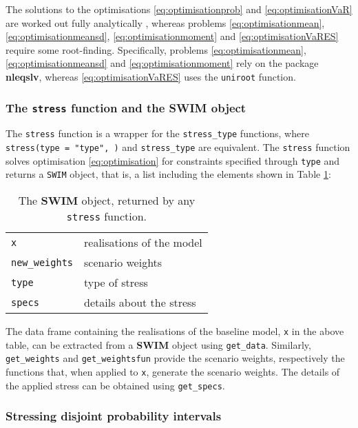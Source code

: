 \documentclass[
]{article}
\begin{document}
The solutions to the optimisations \eqref{eq:optimisationprob} and \eqref{eq:optimisationVaR} are worked out fully analytically \citep{Pesenti2019}, whereas problems \eqref{eq:optimisationmean}, \eqref{eq:optimisationmeansd}, \eqref{eq:optimisationmoment} and \eqref{eq:optimisationVaRES} require some root-finding. Specifically, problems \eqref{eq:optimisationmean}, \eqref{eq:optimisationmeansd} and \eqref{eq:optimisationmoment} rely on the package \textbf{nleqslv}, whereas \eqref{eq:optimisationVaRES} uses the \texttt{uniroot} function.

\hypertarget{Rstress}{%
\subsubsection{\texorpdfstring{The \texttt{stress} function and the \textbf{SWIM} object}{The stress function and the SWIM object}}\label{Rstress}}

The \texttt{stress} function is a wrapper for the \texttt{stress\_type} functions, where \texttt{stress(type\ =\ "type",\ )} and \texttt{stress\_type} are equivalent. The \texttt{stress} function solves optimisation \eqref{eq:optimisation} for constraints specified through \texttt{type} and returns a \texttt{SWIM} object, that is, a list including the elements shown in Table \ref{tab:SWIMobject}:

\begin{longtable}[]{@{}ll@{}}
\caption{\label{tab:SWIMobject} The \textbf{SWIM} object, returned by any \texttt{stress} function.}\tabularnewline
\toprule
\endhead
\texttt{x} & realisations of the model\tabularnewline
\texttt{new\_weights} & scenario weights\tabularnewline
\texttt{type} & type of stress\tabularnewline
\texttt{specs} & details about the stress\tabularnewline
\bottomrule
\end{longtable}

The data frame containing the realisations of the baseline model, \texttt{x} in the above table, can be extracted from a \textbf{SWIM} object using \texttt{get\_data}. Similarly, \texttt{get\_weights} and \texttt{get\_weightsfun} provide the scenario weights, respectively the functions that, when applied to \texttt{x}, generate the scenario weights. The details of the applied stress can be obtained using \texttt{get\_specs}.

\hypertarget{stressing-disjoint-probability-intervals}{%
\subsubsection{Stressing disjoint probability intervals}\label{stressing-disjoint-probability-intervals}}
\end{document}
